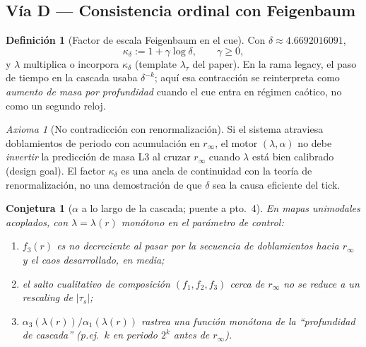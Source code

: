 \documentclass[11pt,a4paper]{article}
\theoremstyle{definition}
\newtheorem{definition}{Definici\'on}[section]
\theoremstyle{plain}
\newtheorem{conjecture}{Conjetura}[section]
\theoremstyle{remark}
\newtheorem{axiom}{Axioma}[section]
\begin{document}
\subsection{V\'ia D --- Consistencia ordinal con Feigenbaum}

\begin{definition}[Factor de escala Feigenbaum en el cue]
\label{def:feig}
Con $\delta\approx 4.6692016091$,
\begin{equation}
\kappa_\delta:=1+\gamma\log\delta,\qquad\gamma\ge 0,
\end{equation}
y $\lambda$ multiplica o incorpora $\kappa_\delta$ (template
$\lambda_\tau$ del paper). En la rama legacy, el paso de tiempo en la
cascada usaba $\delta^{-k}$; aqu\'i esa contracción se reinterpreta como
\emph{aumento de masa por profundidad} cuando el cue entra en r\'egimen
ca\'otico, no como un segundo reloj.
\end{definition}

\begin{axiom}[No contradicción con renormalización]
\label{ax:feig}
Si el sistema atraviesa doblamientos de periodo con acumulaci\'on en
$r_\infty$, el motor $(\lambda,\alpha)$ no debe \emph{invertir} la
predicci\'on de masa L3 al cruzar $r_\infty$ cuando $\lambda$ est\'a
bien calibrado (design goal). El factor $\kappa_\delta$ es una ancla de
continuidad con la teor\'ia de renormalización, no una demostración de
que $\delta$ sea la causa eficiente del tick.
\end{axiom}

\begin{conjecture}[$\alpha$ a lo largo de la cascada; puente a pto.~4]
\label{conj:cascade}
En mapas unimodales acoplados, con $\lambda=\lambda(r)$ mon\'otono en el
par\'ametro de control:
\begin{enumerate}[label=(\roman*)]
  \item $f_3(r)$ es no decreciente al pasar por la secuencia de
  doblamientos hacia $r_\infty$ y el caos desarrollado, en media;
  \item el salto cualitativo de composici\'on $(f_1,f_2,f_3)$ cerca de
  $r_\infty$ no se reduce a un rescaling de $|\tau_s|$;
  \item $\alpha_3(\lambda(r))/\alpha_1(\lambda(r))$ rastrea una
  funci\'on mon\'otona de la ``profundidad de cascada'' (p.ej.\ $k$ en
  periodo $2^k$ antes de $r_\infty$).
\end{enumerate}
\end{conjecture}

\end{document}
